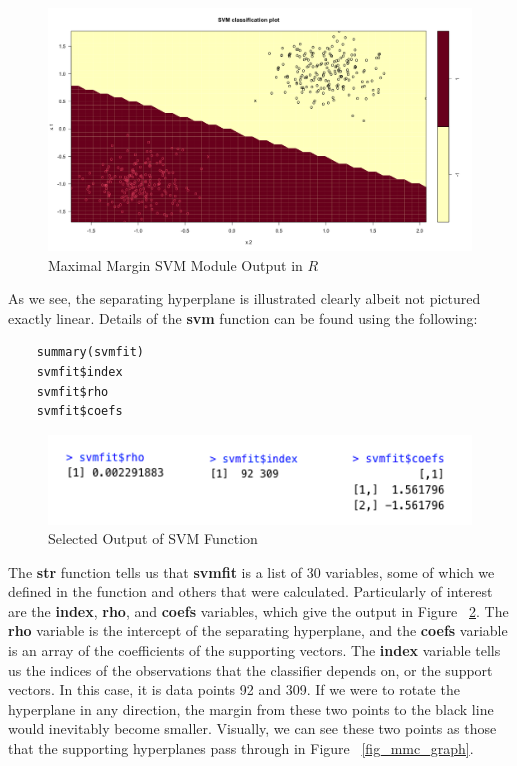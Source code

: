\documentclass[12pt]{article}
\begin{document}
\begin{figure}
    \centering
    \includegraphics[width=5.5in]{Figures/mmc/mmc_module_output.png}
    \caption{Maximal Margin SVM Module Output in $R$}
    \label{fig_mmc_module_output}
\end{figure}
As we see, the separating hyperplane is illustrated clearly albeit not pictured exactly linear. Details of the \textbf{svm} function can be found using the following:
\begin{verbatim}
    summary(svmfit)
    svmfit$index
    svmfit$rho
    svmfit$coefs
\end{verbatim}

\begin{figure}[ht]
    \centering
    \includegraphics[width=5in]{Figures/mmc/mmc_selected_output.png}
    \caption{Selected Output of SVM Function}
    \label{fig_mmc_selected_output}
\end{figure}

The \textbf{str} function tells us that \textbf{svmfit} is a list of 30 variables, some of which we defined in the function and others that were calculated. Particularly of interest are the \textbf{index}, \textbf{rho}, and \textbf{coefs} variables, which give the output in Figure ~\ref{fig_mmc_selected_output}. The \textbf{rho} variable is the intercept of the separating hyperplane, and the \textbf{coefs} variable is an array of the coefficients of the supporting vectors. The \textbf{index} variable tells us the indices of the observations that the classifier depends on, or the support vectors. In this case, it is data points 92 and 309. If we were to rotate the hyperplane in any direction, the margin from these two points to the black line would inevitably become smaller. Visually, we can see these two points as those that the supporting hyperplanes pass through in Figure ~\ref{fig_mmc_graph}.
\end{document}
